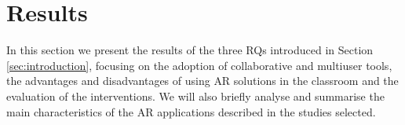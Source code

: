 \section{Results} \label{sec:results}

In this section we present the results of the three \glspl{RQ} introduced in Section \ref{sec:introduction}, focusing on the adoption of collaborative and multiuser tools, the advantages and disadvantages of using \gls{AR} solutions in the classroom and the evaluation of the interventions. We will also briefly analyse and summarise the main characteristics of the \gls{AR} applications described in the studies selected.










